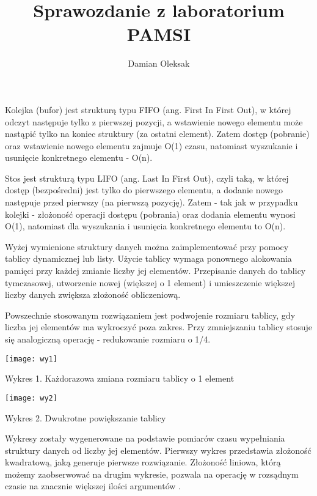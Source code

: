\documentclass[12pt,a4paper]{article}
\title{Sprawozdanie z laboratorium PAMSI}
\author{Damian Oleksak}
\date{}
\begin{document}
\maketitle

Kolejka (bufor) jest strukturą typu FIFO (ang. First In First Out), w której odczyt następuje tylko 
z pierwszej pozycji, a wstawienie nowego elementu może nastąpić tylko na koniec struktury 
(za ostatni element). Zatem dostęp (pobranie) oraz wstawienie nowego elementu zajmuje O(1)
czasu, natomiast wyszukanie i usunięcie konkretnego elementu - O(n).

Stos jest strukturą typu LIFO (ang. Last In First Out), czyli taką, w której dostęp (bezpośredni)
jest tylko do pierwszego elementu, a dodanie nowego następuje przed pierwszy (na pierwszą pozycję). Zatem - tak jak w przypadku kolejki - złożoność operacji dostępu (pobrania) oraz dodania elementu wynosi O(1), natomiast dla wyszukania i usunięcia konkretnego elementu 
to O(n).

Wyżej wymienione struktury danych można zaimplementować przy pomocy tablicy dynamicznej lub listy. Użycie tablicy wymaga ponownego alokowania pamięci przy każdej zmianie liczby jej elementów. Przepisanie danych do tablicy tymczasowej, utworzenie nowej (większej o 1 element) i umieszczenie większej liczby danych zwiększa złożoność obliczeniową. 

Powszechnie stosowanym rozwiązaniem jest podwojenie rozmiaru tablicy, gdy liczba jej elementów ma wykroczyć poza zakres. Przy zmniejszaniu tablicy stosuje się analogiczną
operację - redukowanie rozmiaru o 1/4.

\texttt{[image: wy1]}

Wykres 1. Każdorazowa zmiana rozmiaru tablicy o 1 element \newline

\texttt{[image: wy2]}

Wykres 2. Dwukrotne powiększanie tablicy \newline

Wykresy zostały wygenerowane na podstawie pomiarów czasu wypełniania struktury danych od liczby jej elementów. Pierwszy wykres przedstawia złożoność kwadratową, jaką generuje pierwsze rozwiązanie. Złożoność liniowa, którą możemy zaobserwować na drugim wykresie, pozwala na operację w rozsądnym czasie na znacznie większej ilości argumentów .  \newline
\end{document}
